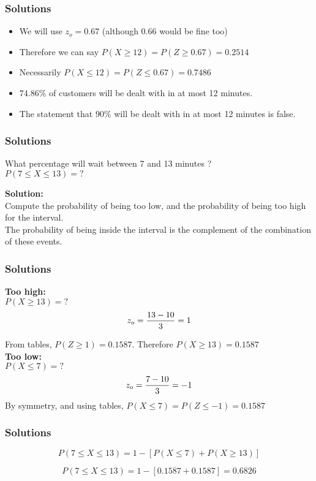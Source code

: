 \begin{frame}
\frametitle{Solutions}
\begin{itemize}
\item We will use $z_o =0.67$ (although 0.66 would be fine too) 
\item Therefore we can say $P(X \geq 12 ) = P(Z \geq 0.67)  = 0.2514$
\item Necessarily  $P(X \leq 12 ) = P(Z \leq 0.67) = 0.7486$
\item $74.86\%$ of customers will be dealt with in at most 12 minutes.
\item The statement that $90\%$ will be dealt with in at most 12 minutes is false.
\end{itemize}
\end{frame}
\begin{frame}
\frametitle{Solutions}
What percentage will wait between 7 and 13 minutes ?\\

$P(7 \leq X \leq 13)   = ?$

\textbf{Solution:}\\
Compute the probability of being too low, and the probability of being too high for the interval.\\The probability of being inside the interval is the complement of the combination of these events.
\end{frame}
\begin{frame}
\frametitle{Solutions}
\textbf{Too high:}\\
$P(X \geq 13) = ?$
\[ z_o  = {13 - 10  \over 3} = 1\]

From tables, $P(Z \geq 1) = 0.1587$. Therefore $P(X \geq 13) = 0.1587$\\ \bigskip
\textbf{Too low:}\\
$P(X \leq 7) = ?$
\[ z_o  = {7 - 10  \over 3} = -1\]
By symmetry, and using tables, $P(X \leq 7) = P(Z \leq -1)= 0.1587$\\ \bigskip
\end{frame}
\begin{frame}
\frametitle{Solutions}

\[P(7 \leq X \leq 13)  = 1 - [ P(X \leq 7)  + P(X \geq 13) ] \]

\[P(7 \leq X \leq 13)  =  1 - [0.1587+0.1587] = 0.6826\]

\end{frame}

